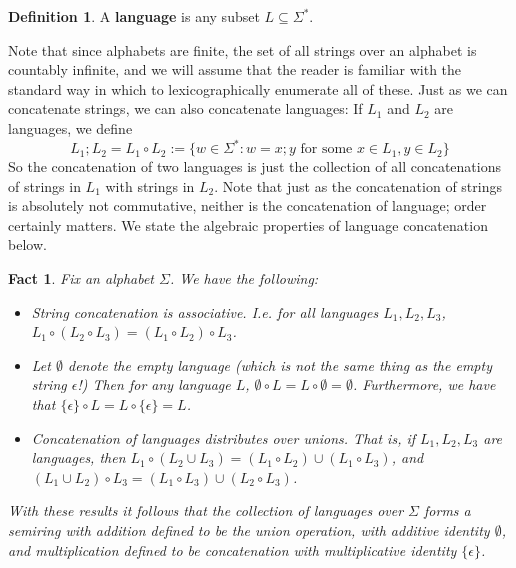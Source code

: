 \documentclass{article}
\theoremstyle{definition}
\newtheorem{definition}{Definition}[section]
\theoremstyle{plain}
\theoremstyle{theorem}
\newtheorem{fact}{Fact}[section]
\begin{document}
\begin{definition}
	A \textbf{language} is any subset $L \subseteq \Sigma^*$. 
\end{definition}
Note that since alphabets are finite, the set of all strings over an alphabet is countably infinite, and we will assume that the reader is familiar with the standard way in which to lexicographically enumerate all of these. Just as we can concatenate strings, we can also concatenate languages: If $L_1$ and $L_2$ are languages, we define
\[ L_1;L_2 = L_1 \circ L_2 := \{w \in \Sigma^*: w = x;y \textrm{ for some }x \in L_1, y \in L_2\} \]
So the concatenation of two languages is just the collection of all concatenations of strings in $L_1$ with strings in $L_2$. Note that just as the concatenation of strings is absolutely not commutative, neither is the concatenation of language; order certainly matters. We state the algebraic properties of language concatenation below. 
\begin{fact}
	Fix an alphabet $\Sigma$. We have the following:
	\begin{itemize}
		\item[(a)] String concatenation is associative. I.e. for all languages $L_1,L_2,L_3$, $L_1 \circ (L_2 \circ L_3) = (L_1 \circ L_2) \circ L_3$.
		\item[(b)] Let $\emptyset$ denote the empty language (which is not the same thing as the empty string $\epsilon$!) Then for any language $L$, $\emptyset \circ L = L \circ \emptyset = \emptyset$. Furthermore, we have that $\{\epsilon\} \circ L = L \circ \{\epsilon\} = L$. 
		\item[(c)] Concatenation of languages distributes over unions. That is, if $L_1,L_2,L_3$ are languages, then $L_1 \circ (L_2 \cup L_3) = (L_1 \circ L_2) \cup (L_1 \circ L_3)$, and $(L_1 \cup L_2) \circ L_3 = (L_1 \circ L_3) \cup (L_2 \circ L_3)$. 
	\end{itemize}
	With these results it follows that the collection of languages over $\Sigma$ forms a semiring with addition defined to be the union operation, with additive identity $\emptyset$, and multiplication defined to be concatenation with multiplicative identity $\{\epsilon\}$. 
\end{fact}
\end{document}
